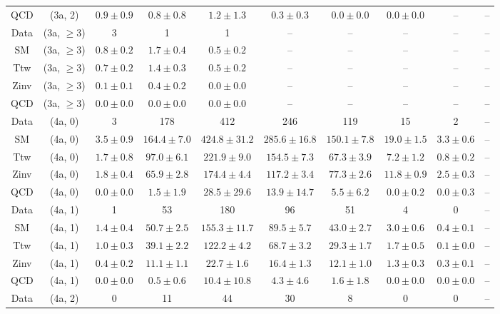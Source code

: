 \begin{table}[h!]
{\begin{tabular}{cccccccccc}
	QCD & (3a, 2) & $0.9\pm 0.9$ & $0.8\pm 0.8$ & $1.2\pm 1.3$ & $0.3\pm 0.3$ & $0.0\pm 0.0$ & $0.0\pm 0.0$ & -- & -- \\[0.5ex] 
	Data & (3a, $\ge3$) & 3 & 1 & 1 & -- & -- & -- & -- & -- \\[0.5ex] 
	SM & (3a, $\ge3$) & $0.8\pm 0.2$ & $1.7\pm 0.4$ & $0.5\pm 0.2$ & -- & -- & -- & -- & -- \\[0.5ex] 
	Ttw & (3a, $\ge3$) & $0.7\pm 0.2$ & $1.4\pm 0.3$ & $0.5\pm 0.2$ & -- & -- & -- & -- & -- \\[0.5ex] 
	Zinv & (3a, $\ge3$) & $0.1\pm 0.1$ & $0.4\pm 0.2$ & $0.0\pm 0.0$ & -- & -- & -- & -- & -- \\[0.5ex] 
	QCD & (3a, $\ge3$) & $0.0\pm 0.0$ & $0.0\pm 0.0$ & $0.0\pm 0.0$ & -- & -- & -- & -- & -- \\[0.5ex] 
	Data & (4a, 0) & 3 & 178 & 412 & 246 & 119 & 15 & 2 & -- \\[0.5ex] 
	SM & (4a, 0) & $3.5\pm 0.9$ & $164.4\pm 7.0$ & $424.8\pm 31.2$ & $285.6\pm 16.8$ & $150.1\pm 7.8$ & $19.0\pm 1.5$ & $3.3\pm 0.6$ & -- \\[0.5ex] 
	Ttw & (4a, 0) & $1.7\pm 0.8$ & $97.0\pm 6.1$ & $221.9\pm 9.0$ & $154.5\pm 7.3$ & $67.3\pm 3.9$ & $7.2\pm 1.2$ & $0.8\pm 0.2$ & -- \\[0.5ex] 
	Zinv & (4a, 0) & $1.8\pm 0.4$ & $65.9\pm 2.8$ & $174.4\pm 4.4$ & $117.2\pm 3.4$ & $77.3\pm 2.6$ & $11.8\pm 0.9$ & $2.5\pm 0.3$ & -- \\[0.5ex] 
	QCD & (4a, 0) & $0.0\pm 0.0$ & $1.5\pm 1.9$ & $28.5\pm 29.6$ & $13.9\pm 14.7$ & $5.5\pm 6.2$ & $0.0\pm 0.2$ & $0.0\pm 0.3$ & -- \\[0.5ex] 
	Data & (4a, 1) & 1 & 53 & 180 & 96 & 51 & 4 & 0 & -- \\[0.5ex] 
	SM & (4a, 1) & $1.4\pm 0.4$ & $50.7\pm 2.5$ & $155.3\pm 11.7$ & $89.5\pm 5.7$ & $43.0\pm 2.7$ & $3.0\pm 0.6$ & $0.4\pm 0.1$ & -- \\[0.5ex] 
	Ttw & (4a, 1) & $1.0\pm 0.3$ & $39.1\pm 2.2$ & $122.2\pm 4.2$ & $68.7\pm 3.2$ & $29.3\pm 1.7$ & $1.7\pm 0.5$ & $0.1\pm 0.0$ & -- \\[0.5ex] 
	Zinv & (4a, 1) & $0.4\pm 0.2$ & $11.1\pm 1.1$ & $22.7\pm 1.6$ & $16.4\pm 1.3$ & $12.1\pm 1.0$ & $1.3\pm 0.3$ & $0.3\pm 0.1$ & -- \\[0.5ex] 
	QCD & (4a, 1) & $0.0\pm 0.0$ & $0.5\pm 0.6$ & $10.4\pm 10.8$ & $4.3\pm 4.6$ & $1.6\pm 1.8$ & $0.0\pm 0.0$ & $0.0\pm 0.0$ & -- \\[0.5ex] 
	Data & (4a, 2) & 0 & 11 & 44 & 30 & 8 & 0 & 0 & -- \\[0.5ex] 

\end{tabular}}
\end{table}
